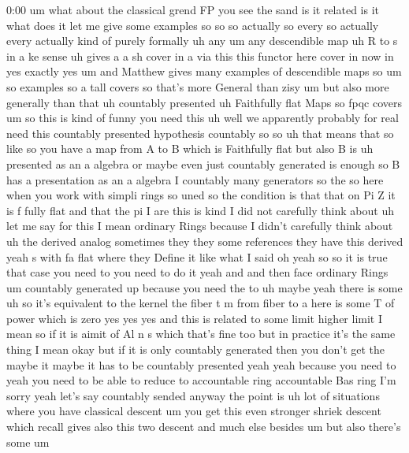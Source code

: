 \begin{unfinished}{0:00}
um  what  about  the  classical  grend  FP  you
see  the  sand  is  it  related  is  it  what
does  it  let  me  give  some  examples  so  so
so  actually  so  every  so  actually
every  actually  kind  of  purely
formally  uh  any  um  any  descendible
map  uh  R  to  s  in  a  ke
sense  uh  gives
a  a  sh  cover  in
a  via  this  this  functor
here  cover  in  now  in  yes  exactly
yes  um
and  Matthew  gives  many  examples  of
descendible  maps  so
um  so  examples  so  a  tall
covers  so  that's  more  General  than  zisy
um  but  also  more  generally  than  that  uh
countably
presented  uh  Faithfully  flat  Maps  so
fpqc  covers
um  so  this  is  kind  of  funny  you  need
this  uh  well  we  apparently  probably  for
real  need  this  countably  presented
hypothesis  countably
so  so  uh  that  means  that  so  like  so  you
have  a  map  from  A  to  B  which  is
Faithfully
flat  but  also  B  is  uh  presented  as  an  a
algebra  or  maybe  even  just  countably
generated  is  enough  so  B  has  a
presentation  as  an  a  algebra  I  countably
many  generators  so  the  so  here  when  you
work  with  simpli  rings  so  uned  so  the
condition  is  that  that  on  Pi  Z  it  is  f
fully  flat  and  that  the  pi  I  are  this  is
kind  I  did  not  carefully  think  about  uh
let  me  say  for  this  I  mean  ordinary
Rings  because  I  didn't  carefully  think
about  uh  the  derived  analog  sometimes
they  they  some  references  they  have  this
derived  yeah  s  with  fa  flat  where  they
Define  it  like  what  I  said  oh  yeah  so  so
it  is  true  that  case  you  need  to  you
need  to  do  it  yeah  and  and
then
face  ordinary
Rings
um
countably  generated  up  because  you  need
the
to  uh  maybe  yeah
there  is  some  uh  so  it's  equivalent  to
the  kernel  the  fiber  t  m  from  fiber  to  a
here  is  some  T  of  power  which  is  zero
yes  yes  yes  and  this  is  related  to  some
limit  higher  limit  I  mean  so  if  it  is
aimit  of  Al  n  s  which  that's  fine  too
but  in  practice  it's  the  same  thing  I
mean  okay  but  if  it  is  only  countably
generated  then  you  don't  get  the  maybe
it  maybe  it  has  to  be  countably
presented  yeah  yeah  because  you  need  to
yeah  you  need  to  be  able  to  reduce  to
accountable  ring  accountable  Bas  ring
I'm  sorry  yeah  let's  say  countably
sended  anyway  the  point
is  uh  lot  of  situations  where  you  have
classical  descent  um  you  get  this  even
stronger  shriek  descent  which  recall
gives  also  this  two  descent  and  much
else  besides  um  but  also  there's  some  um

\end{unfinished}
